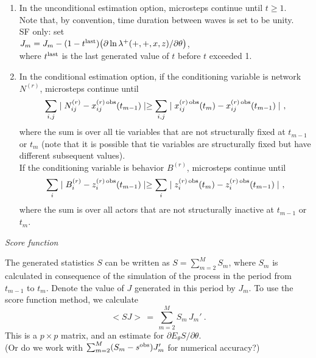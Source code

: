 \documentclass[a4paper,12pt,fleqn]{article}
\begin{document}
\begin{enumerate}
\item In the unconditional estimation option, microsteps continue until
      $t \geq 1$. \\
      Note that, by convention, time duration between waves is set to be unity.\\
      SF only: set \\
      $J_m = J_m - (1 - t^{\rm{last}})
           \big(\partial \ln \lambda^+(+,+,x,z) / \partial \theta\big) $,\\
      where $t^{\rm{last}}$ is the last generated value of $t$ before $t$ exceeded 1.
\item In the conditional estimation option, if the conditioning variable
      is network $N^{(r)}$, microsteps continue until
      \[
      \sum_{i,j} \mid N^{(r)}_{ij} - x^{(r)\,\rm{obs}}_{ij}(t_{m-1}) \mid \geq
       \sum_{i,j} \mid x^{(r)\,\rm{obs}}_{ij}(t_{m})  - x^{(r)\,\rm{obs}}_{ij}(t_{m-1}) \mid \ ,
      \]
      where the sum is over all tie variables that are not structurally fixed
      at $t_{m-1}$ or $t_m$ (note that
      it is possible that tie variables are structurally fixed but have different subsequent values).\\
      If the conditioning variable
      is behavior $B^{(r)}$, microsteps continue until
      \[
      \sum_{i} \mid B^{(r)}_{i} - z^{(r)\,\rm{obs}}_{i}(t_{m-1}) \mid \geq
       \sum_{i} \mid z^{(r)\,\rm{obs}}_{i}(t_{m})  - z^{(r)\,\rm{obs}}_{i}(t_{m-1}) \mid \ ,
      \]
      where the sum is over all actors that are not structurally inactive
      at $t_{m-1}$ or $t_m$.
\end{enumerate}
\medskip

\emph{Score function}
\smallskip

The generated statistics $S$ can be written as $S = \sum_{m=2}^M S_m$, where $S_m$ is calculated
in consequence of the simulation of the process in the period from $t_{m-1}$ to $t_m$.
Denote the value of $J$ generated in this period by $J_m$.
To use the score function method, we calculate
\begin{equation}
  <\!SJ\!> \,=\, \sum_{m=2}^M  S_m \, J_m' \ .    \label{SJ}
\end{equation}
This is a $p \times p$ matrix,
and an estimate for $\partial E_{\theta}S/\partial \theta$.\\
(Or do we work with $\sum_{m=2}^M  (S_m - s^{\rm{obs}}) J_m'$
for numerical accuracy?)
\end{document}
